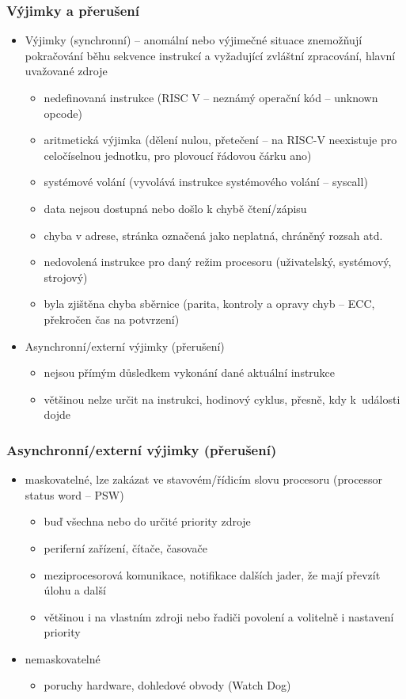 \documentclass{beamer}
\begin{document}
\begin{frame}
\frametitle{Výjimky a přerušení}

\begin{itemize}
 \item Výjimky (synchronní) -- anomální nebo výjimečné situace znemožňují pokračování běhu sekvence instrukcí a vyžadující zvláštní zpracování, hlavní uvažované zdroje
 \begin{itemize}
  \item nedefinovaná instrukce (RISC V -- neznámý operační kód -- unknown opcode)
  \item aritmetická výjimka (dělení nulou, přetečení -- na RISC-V neexistuje pro celočíselnou jednotku, pro plovoucí řádovou čárku ano)
  \item systémové volání (vyvolává instrukce systémového volání -- syscall)
  \item data nejsou dostupná nebo došlo k chybě čtení/zápisu
  \item chyba v adrese, stránka označená jako neplatná, chráněný rozsah atd.
  \item nedovolená instrukce pro daný režim procesoru (uživatelský, systémový, strojový)
  \item byla zjištěna chyba sběrnice (parita, kontroly a opravy chyb -- ECC, překročen čas na potvrzení)
 \end{itemize}
 \item Asynchronní/externí výjimky (přerušení)
 \begin{itemize}
  \item nejsou přímým důsledkem vykonání dané aktuální instrukce
  \item většinou nelze určit na instrukci, hodinový cyklus, přesně, kdy k~události dojde
 \end{itemize}
\end{itemize}
\end{frame}

\begin{frame}
\frametitle{Asynchronní/externí výjimky (přerušení)}

\begin{itemize}
 \item maskovatelné, lze zakázat ve stavovém/řídicím slovu procesoru (processor status word -- PSW)
 \begin{itemize}
   \item buď všechna nebo do určité priority zdroje
   \item periferní zařízení, čítače, časovače
   \item meziprocesorová komunikace, notifikace dalších jader, že mají převzít úlohu a další
   \item většinou i na vlastním zdroji nebo řadiči povolení a volitelně i nastavení priority
 \end{itemize}
 \item nemaskovatelné
 \begin{itemize}
  \item poruchy hardware, dohledové obvody (Watch Dog)
 \end{itemize}
\end{itemize}
\end{frame}
\end{document}
